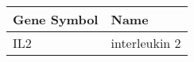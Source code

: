 \begin{tabular}{ll}
\toprule
Gene Symbol &          Name \\
\midrule
        IL2 & interleukin 2 \\
\bottomrule
\end{tabular}
